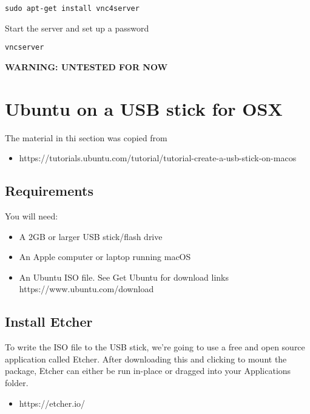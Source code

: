 \begin{verbatim}
sudo apt-get install vnc4server
\end{verbatim}

Start the server and set up a password

\begin{verbatim}
vncserver
\end{verbatim}

\textbf{WARNING: UNTESTED FOR NOW}

\hypertarget{ubuntu-on-a-usb-stick-for-osx}{%
\section{Ubuntu on a USB stick for
OSX}\label{ubuntu-on-a-usb-stick-for-osx}}

The material in thi section was copied from

\begin{itemize}
\tightlist
\item
  https://tutorials.ubuntu.com/tutorial/tutorial-create-a-usb-stick-on-macos
\end{itemize}

\hypertarget{requirements}{%
\subsection{Requirements}\label{requirements}}

You will need:

\begin{itemize}
\tightlist
\item
  A 2GB or larger USB stick/flash drive
\item
  An Apple computer or laptop running macOS
\item
  An Ubuntu ISO file. See Get Ubuntu for download links
  https://www.ubuntu.com/download
\end{itemize}

\hypertarget{install-etcher}{%
\subsection{Install Etcher}\label{install-etcher}}

To write the ISO file to the USB stick, we're going to use a free and
open source application called Etcher. After downloading this and
clicking to mount the package, Etcher can either be run in-place or
dragged into your Applications folder.

\begin{itemize}
\tightlist
\item
  https://etcher.io/
\end{itemize}

